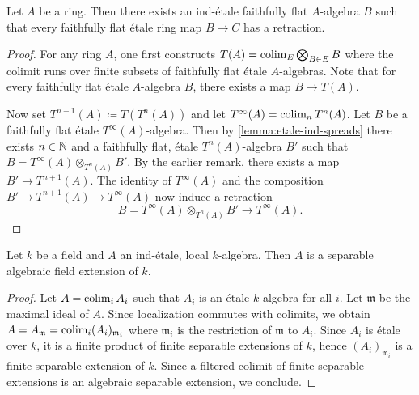 \begin{proposition}
    Let $A$ be a ring. Then there exists an ind-étale faithfully flat $A$-algebra $B$ such that
    every faithfully flat étale ring map $B \to C$ has a retraction.
    \label{prop:exists-ind-etale-retraction-etale}
\end{proposition}

\begin{proof}
    For any ring $A$, one first constructs $T(A) = \operatorname{colim}_{E} \bigotimes_{B \in E} B$ where
    the colimit runs over finite subsets of faithfully flat étale $A$-algebras. Note that for every faithfully flat étale
    $A$-algebra $B$, there exists a map $B \to T(A)$.

    Now set $T^{n+1}(A) \coloneqq T(T^n(A))$
    and let $T^{\infty}(A) = \operatorname{colim}_n T^n(A)$. Let $B$ be a faithfully flat étale $T^{\infty}(A)$-algebra. Then
    by \ref{lemma:etale-ind-spreads}
    there exists $n \in \mathbb{N}$ and a faithfully flat, étale $T^n(A)$-algebra $B'$ such that
    $B = T^{\infty}(A) \otimes_{T^n(A)} B'$. By the earlier remark, there exists a map
    $B' \to T^{n+1}(A)$. The identity of $T^{\infty}(A)$ and the composition
    $B' \to T^{n+1}(A) \to T^{\infty}(A)$ now induce a retraction
    \[
    B = T^{\infty}(A) \otimes_{T^n(A)} B' \to T^{\infty}(A)
    .\]
\end{proof}

\begin{lemma}
    Let $k$ be a field and $A$ an ind-étale, local $k$-algebra. Then $A$ is
    a separable algebraic field extension of $k$.
    \label{lemma:field-local-indetale}
\end{lemma}

\begin{proof}
    Let $A = \operatorname{colim}_i A_i$ such that $A_i$ is an étale $k$-algebra for all $i$.
    Let $\mathfrak{m}$ be the maximal ideal of $A$. Since localization commutes with colimits,
    we obtain $A = A_{\mathfrak{m}} = \operatorname{colim}_i (A_i)_{\mathfrak{m}_i}$ where
    $\mathfrak{m}_i$ is the restriction of $\mathfrak{m}$ to $A_i$. Since $A_i$ is étale over $k$,
    it is a finite product of finite separable extensions of $k$, hence $(A_i)_{\mathfrak{m}_i}$
    is a finite separable extension of $k$. Since a filtered colimit of finite separable
    extensions is an algebraic separable extension, we conclude.
\end{proof}

